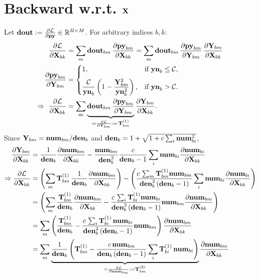 \documentclass{article}
\begin{document}

\section{Backward w.r.t. $\v{X}$}

Let $\v{dout}:=\ddfrac{\mathcal{L}}{\v{py}}\in\mathbb{R}^{B\times M}$. For arbitrary indices $b,k$:
\begin{align}
\ddfrac{\mathcal{L}}{\v{X}{bk}}
&= \sum_m \v{dout}{bm}\,\ddfrac{\v{py}{bm}}{\v{X}{bk}}
= \sum_m \v{dout}{bm}\,\ddfrac{\v{py}{bm}}{\v{Y}{bm}}\,\ddfrac{\v{Y}{bm}}{\v{X}{bk}} \\
\ddfrac{\v{py}{bm}}{\v{Y}{bm}} &=
\begin{cases}
  1, & \text{if } \v{yn}_b \le \mathcal{C}, \\[6pt]
  \dfrac{\mathcal{C}}{\v{yn}_b}\left(1 - \dfrac{\v{Y}{bm}^2}{\v{yn}_b^2}\right),
    & \text{if } \v{yn}_b > \mathcal{C}.
\end{cases} \\
\Rightarrow\ \ddfrac{\mathcal{L}}{\v{X}{bk}}
&= \sum_m \underbrace{\v{dout}{bm}\,\ddfrac{\v{py}{bm}}{\v{Y}{bm}}}_{=\ddfrac{\mathcal{L}}{\v{Y}{bm}}:=\,\T{1}{bm}} \ddfrac{\v{Y}{bm}}{\v{X}{bk}}.
\end{align}
Since $\v{Y}{bm}=\v{num}{bm}/\v{den}{b}$ and $\v{den}{b} = 1+\sqrt{1+c\sum_i \v{num}{bi}^2}$,
\begin{align}
\ddfrac{\v{Y}{bm}}{\v{X}{bk}}
&= \frac{1}{\v{den}{b}}\ddfrac{\v{num}{bm}}{\v{X}{bk}} - \frac{\v{num}{bm}}{\v{den}{b}^2}\frac{c}{\v{den}{b}-1}\sum_i \v{num}{bi}\ddfrac{\v{num}{bi}}{\v{X}{bk}} \\
\Rightarrow \ddfrac{\mathcal{L}}{\v{X}{bk}} &= \left( \sum_m \T{1}{bm}\,\frac{1}{\v{den}{b}}\ddfrac{\v{num}{bm}}{\v{X}{bk}} \right) - \left( \frac{c\,\sum_m \T{1}{bm} \v{num}{bm}}{\v{den}{b}^2\,(\v{den}{b}-1)}\sum_i \v{num}{bi}\ddfrac{\v{num}{bi}}{\v{X}{bk}} \right) \\
&= \left( \sum_m \frac{\T{1}{bm}}{\v{den}{b}}\ddfrac{\v{num}{bm}}{\v{X}{bk}} - \frac{c\,\sum_i \T{1}{bi} \v{num}{bi}}{\v{den}{b}^2\,(\v{den}{b}-1)} \v{num}{bm}\ddfrac{\v{num}{bm}}{\v{X}{bk}} \right) \\
&= \sum_m \left( \frac{\T{1}{bm}}{\v{den}{b}} - \frac{c\,\sum_i \T{1}{bi}\, \v{num}{bi}}{\v{den}{b}^2\,(\v{den}{b}-1)} \v{num}{bm} \right) \ddfrac{\v{num}{bm}}{\v{X}{bk}}  \\
&= \sum_m \underbrace{\frac{1}{\v{den}{b}} \left(\T{1}{bm} - \frac{c\,\v{num}{bm}}{\v{den}{b}\,(\v{den}{b}-1)} \sum_i \T{1}{bi}\, \v{num}{bi}  \right)}_{=\ddfrac{\mathcal{L}}{\v{num}{bm}}:=\T{2}{bm}} \ddfrac{\v{num}{bm}}{\v{X}{bk}}  \\
\end{align}
\end{document}
